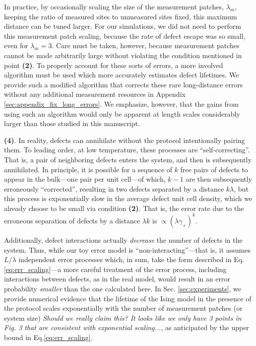 \documentclass[twocolumn,superscriptaddress,aps,prb,floatfix]{revtex4-1}
\newcommand{\CMH}[1]{{\color{green} { #1}}}
\begin{document}
 In practice, by occasionally scaling the size of the measurement patches, $\lambda_m$, keeping the ratio of measured sites to unmeasured sites fixed, this maximum distance can be tuned larger.  For our simulations, we did not need to perform this measurement patch scaling, because the rate of defect escape was so small, even for $\lambda_m=3$.  Care must be taken, however, because measurement patches cannot be made arbitrarily large without violating the condition mentioned in point \textbf{(2)}.  To properly account for these sorts of errors, a more involved algorithm must be used which more accurately estimates defect lifetimes.  We provide such a modified algorithm that corrects these rare long-distance errors without any additional measurement resources in Appendix \ref{sec:appendix_fix_long_errors}.  We emphasize, however, that the gains from using such an algorithm would only be apparent at length scales considerably larger than those studied in this manuscript.

 \textbf{(4)}. In reality, defects can annihilate without the protocol intentionally pairing them.  To leading order, at low temperature, these processes are ``self-correcting''.  That is, a pair of neighboring defects enters the system, and then is subsequently annihilated.  In principle, it is possible for a sequence of $k$ free pairs of defects to appear in the bulk---one pair per unit cell---of which, $k-1$ are then subsequently erroneously ``corrected'', resulting in two defects separated by a distance $k \lambda$, but this process is exponentially slow in the average defect unit cell density, which we already choose to be small via condition \textbf{(2)}.  That is, the error rate due to the erroneous  separation of defects by a distance $\lambda k$ is $\propto(\lambda \gamma_+)^k$.
 
 Additionally, defect interactions actually \emph{decrease} the number of defects in the system.  Thus, while our toy error model is ``non-interacting''---that is, it assumes $L/\lambda$ independent error processes which, in sum, take the form described in Eq. \ref{eq:err_scaling}---a more careful treatment of the error process, including interactions between defects, as in the real model, would result in an error probability \emph{smaller} than the one calculated here.  In Sec. \ref{sec:experiments}, we provide numerical evidence that the lifetime of the Ising model in the presence of the protocol scales exponentially with the number of measurement patches \CMH{(or system size)} \CMH{\it{Should we really claim this? It looks like we only have 3 points in Fig. 3 that are consistent with exponential scaling...}}, as anticipated by the upper bound in Eq.\ref{eq:err_scaling}.
 
\end{document}
